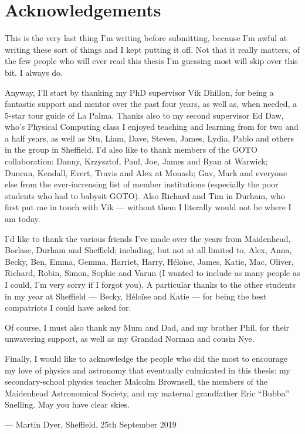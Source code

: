 \chapter*{Acknowledgements}

\begin{onehalfspace}

This is the very last thing I'm writing before submitting, because I'm awful at writing these sort of things and I kept putting it off. Not that it really matters, of the few people who will ever read this thesis I'm guessing most will skip over this bit. I always do.

Anyway, I'll start by thanking my PhD supervisor Vik Dhillon, for being a fantastic support and mentor over the past four years, as well as, when needed, a 5-star tour guide of La Palma. Thanks also to my second supervisor Ed Daw, who's Physical Computing class I enjoyed teaching and learning from for two and a half years, as well as Stu, Liam, Dave, Steven, James, Lydia, Pablo and others in the group in Sheffield. I'd also like to thank members of the GOTO collaboration: Danny, Krzysztof, Paul, Joe, James and Ryan at Warwick; Duncan, Kendall, Evert, Travis and Alex at Monash; Gav, Mark and everyone else from the ever-increasing list of member institutions (especially the poor students who had to babysit GOTO). Also Richard and Tim in Durham, who first put me in touch with Vik --- without them I literally would not be where I am today.

I'd like to thank the various friends I've made over the years from Maidenhead, Borlase, Durham and Sheffield; including, but not at all limited to, Alex, Anna, Becky, Ben, Emma, Gemma, Harriet, Harry, Héloïse, James, Katie, Mac, Oliver, Richard, Robin, Simon, Sophie and Varun (I wanted to include as many people as I could, I'm very sorry if I forgot you). A particular thanks to the other students in my year at Sheffield --- Becky, Héloïse and Katie --- for being the best compatriots I could have asked for.

Of course, I must also thank my Mum and Dad, and my brother Phil, for their unwavering support, as well as my Grandad Norman and cousin Nye.

Finally, I would like to acknowledge the people who did the most to encourage my love of physics and astronomy that eventually culminated in this thesis: my secondary-school physics teacher Malcolm Brownsell, the members of the Maidenhead Astronomical Society, and my maternal grandfather Eric ``Bubba'' Snelling. May you have clear skies.

\smallskip

\begin{flushright}
--- Martin Dyer, Sheffield, 25th September 2019
\end{flushright}

\end{onehalfspace}

